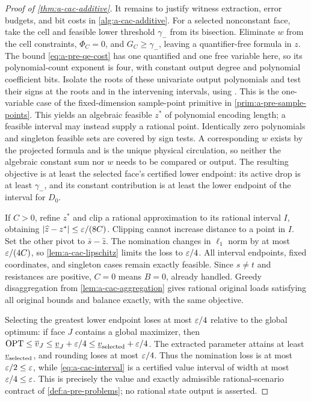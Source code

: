 \begin{proof}[Proof of \cref{thm:a-cac-additive}]
It remains to justify witness extraction, error budgets, and bit costs
in \cref{alg:a-cac-additive}. For a selected nonconstant face, take the
cell and feasible lower threshold $\gamma_-$ from its bisection. Eliminate
$w$ from the cell constraints, $\Phi_C=0$, and $G_C\ge \gamma_-$, leaving a
quantifier-free formula in $z$. The bound
\cref{eq:a-pre-qe-cost} has one quantified and one free variable here,
so its polynomial-count exponent is four, with constant output degree
and polynomial coefficient bits. Isolate the roots of these univariate
output polynomials and test their signs at the roots and in the
intervening intervals, using
\citet[Chapter 10]{basu2006-algorithms-in-real-algebraic-geometry}.
This is the one-variable case of the fixed-dimension sample-point
primitive in \cref{prim:a-pre-sample-points}.
This yields an algebraic feasible $z^*$ of polynomial encoding length;
a feasible interval may instead supply a rational point. Identically
zero polynomials and singleton feasible sets are covered by sign tests.
A corresponding $w$ exists by the projected formula and is the unique
physical circulation, so neither the algebraic constant sum nor $w$
needs to be compared or output. The resulting objective is at least the
selected face's certified lower endpoint: its active drop is at least
$\gamma_-$, and its constant contribution is at least the lower endpoint of
the interval for $D_0$.

If $C>0$, refine $z^*$ and clip a rational approximation to its rational
interval $I$, obtaining $|\widehat z-z^*|\le\varepsilon/(8C)$. Clipping cannot
increase distance to a point in $I$. Set the other pivot to $\bar s-\widehat z$.
The nomination changes in $\ell_1$ norm by at most $\varepsilon/(4C)$, so
\cref{lem:a-cac-lipschitz} limits the loss to $\varepsilon/4$. All interval
endpoints, fixed coordinates, and singleton cases remain exactly
feasible. Since $s\ne t$ and resistances are positive, $C=0$ means
$B=0$, already handled. Greedy disaggregation from
\cref{lem:a-cac-aggregation} gives rational original loads satisfying
all original bounds and balance exactly, with the same objective.

Selecting the greatest lower endpoint loses at most $\varepsilon/4$ relative
to the global optimum: if face $J$ contains a global maximizer, then
$\mathrm{OPT}\le \overline v_J\le \underline v_J+\varepsilon/4\le \underline v_{\rm selected}+\varepsilon/4$.
The extracted parameter attains at least $\underline v_{\rm selected}$,
and rounding loses at most $\varepsilon/4$. Thus the nomination loss is at
most $\varepsilon/2\le\varepsilon$, while
\cref{eq:a-cac-interval} is a certified value interval of width at
most $\varepsilon/4\le\varepsilon$. This is precisely the value and exactly
admissible rational-scenario contract of \cref{def:a-pre-problems};
no rational state output is asserted.


\end{proof}
